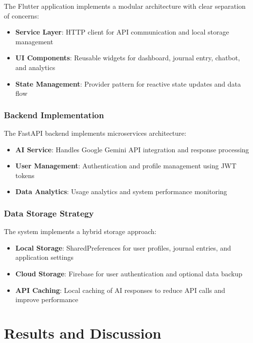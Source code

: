 \documentclass[conference,10pt]{IEEEtran}
\begin{document}
The Flutter application implements a modular architecture with clear separation of concerns:

\begin{itemize}
\item \textbf{Service Layer}: HTTP client for API communication and local storage management
\item \textbf{UI Components}: Reusable widgets for dashboard, journal entry, chatbot, and analytics
\item \textbf{State Management}: Provider pattern for reactive state updates and data flow
\end{itemize}

\subsubsection{Backend Implementation}

The FastAPI backend implements microservices architecture:

\begin{itemize}
\item \textbf{AI Service}: Handles Google Gemini API integration and response processing
\item \textbf{User Management}: Authentication and profile management using JWT tokens
\item \textbf{Data Analytics}: Usage analytics and system performance monitoring
\end{itemize}

\subsubsection{Data Storage Strategy}

The system implements a hybrid storage approach:

\begin{itemize}
\item \textbf{Local Storage}: SharedPreferences for user profiles, journal entries, and application settings
\item \textbf{Cloud Storage}: Firebase for user authentication and optional data backup
\item \textbf{API Caching}: Local caching of AI responses to reduce API calls and improve performance
\end{itemize}

\section{Results and Discussion}
\end{document}
